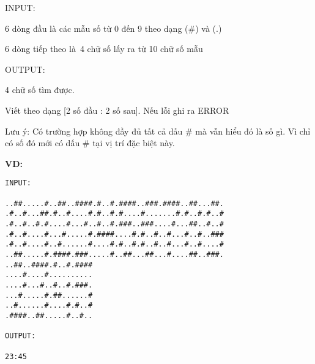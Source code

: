 

INPUT:

6 dòng đầu là các mẫu số từ 0 đến 9 theo dạng (\#) và (.)

6 dòng tiếp theo là 4 chữ số lấy ra từ 10 chữ số mẫu

OUTPUT:

4 chữ số tìm được.

Viết theo dạng [2 số đầu : 2 số sau]. Nếu lỗi ghi ra ERROR

Lưu ý: Có trường hợp không đầy đủ tất cả dấu \# mà vẫn hiểu đó là số gì. Vì chỉ có số đó mới có dấu \# tại vị trí đặc biệt này.

\textbf{VD:}
\begin{verbatim}
INPUT:

..##.....#..##..####.#..#.####..###.####..##...##.
.#..#...##.#..#....#.#..#.#....#.......#.#..#.#..#
.#..#..#.#....#...#..#..#.###..###....#...##..#..#
.#..#....#...#.....#.####....#.#..#..#...#..#..###
.#..#....#..#......#....#.#..#.#..#..#...#..#....#
..##.....#.####.###.....#..##...##...#....##..###.
..##..####.#..#.####
....#....#..........
....#...#..#..#.###.
...#.....#.##......#
..#......#....#.#..#
.####..##.....#..#..

OUTPUT:

23:45\end{verbatim}

 